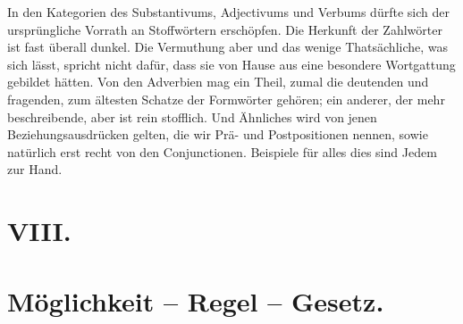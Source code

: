 In den Kategorien des Substantivums, Adjectivums und Verbums dürfte sich der ursprüngliche Vorrath an Stoffwörtern erschöpfen. Die Herkunft der Zahlwörter ist fast überall dunkel. Die Vermuthung aber und das wenige Thatsächliche, was sich  lässt, spricht nicht dafür, dass sie von Hause aus eine besondere Wortgattung gebildet hätten. Von den Adverbien mag ein Theil, zumal die deutenden und fragenden, zum ältesten Schatze der Formwörter gehören; ein anderer, der mehr beschreibende, aber ist rein stofflich. Und Ähnliches wird von jenen Beziehungsausdrücken gelten, die wir Prä- und Postpositionen nennen, sowie natürlich erst recht von den Conjunctionen. Beispiele für alles dies sind Jedem zur Hand.

\label{fp.370}

\section*{VIII.}\label{IV.III.VIII}
\section*{Möglichkeit – Regel – Gesetz.}

